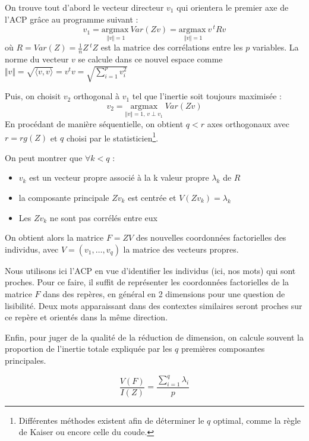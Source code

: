\documentclass[11pt,french,french]{article}
\providecommand{\tightlist}{%
  \setlength{\parskip}{0pt}
  }
\let\rmarkdownfootnote\footnote%
\def\footnote{\protect\rmarkdownfootnote}
\begin{document}
On trouve tout d'abord le vecteur directeur \(v_1\) qui orientera le premier axe de l'ACP grâce au programme suivant :
\[v_1 =\underset{\Vert v \Vert = 1}{\mathrm{argmax~}} Var(Zv) =\underset{\Vert v \Vert = 1}{\mathrm{argmax~}} v\,^t R v \] où \(R = Var(Z) = \frac{1}{n} Z\,^t Z\) est la matrice des corrélations entre les \(p\) variables.
La norme du vecteur \(v\) se calcule dans ce nouvel espace comme \(\Vert v \Vert = \sqrt{\langle v,v\rangle} = v ^tv =\sqrt{ \sum \limits_{i = 1}^p v_i^2}\)

Puis, on choisit \(v_2\) orthogonal à \(v_1\) tel que l'inertie soit toujours maximisée :
\[v_2 =\underset{ \Vert v \Vert = 1,\,v \perp v_1}{\mathrm{argmax}}\;  Var(Zv) \]
En procédant de manière séquentielle, on obtient \(q < r\) axes orthogonaux avec \(r = rg(Z)\) et \(q\) choisi par le statisticien\footnote{Différentes méthodes existent afin de déterminer le \(q\) optimal, comme la règle de Kaiser ou encore celle du coude.}.

On peut montrer que \(\forall k < q\) :

\begin{itemize}
\tightlist
\item
  \(v_k\) est un vecteur propre associé à la k\ieme{} valeur propre \(\lambda_k\) de \(R\)\\
\item
  la composante principale \(Zv_k\) est centrée et \(V(Zv_k)= \lambda_k\)\\
\item
  Les \(Zv_k\) ne sont pas corrélés entre eux
\end{itemize}

On obtient alors la matrice \(F = ZV\) des nouvelles coordonnées factorielles des individus, avec \(V = (v_1,\dots,v_q)\) la matrice des vecteurs propres.

Nous utilisons ici l'ACP en vue d'identifier les individus (ici, nos mots) qui sont proches. Pour ce faire, il suffit de représenter les coordonnées factorielles de la matrice \(F\) dans des repères, en général en 2 dimensions pour une question de lisibilité. Deux mots apparaissant dans des contextes similaires seront proches sur ce repère et orientés dans la même direction.

Enfin, pour juger de la qualité de la réduction de dimension, on calcule souvent la proportion de l'inertie totale expliquée par les \(q\) premières composantes principales.

\[ \frac{V(F)}{I(Z)} = \frac{\sum \limits_{i = 1}^q \lambda_i}{p}\]
\end{document}

